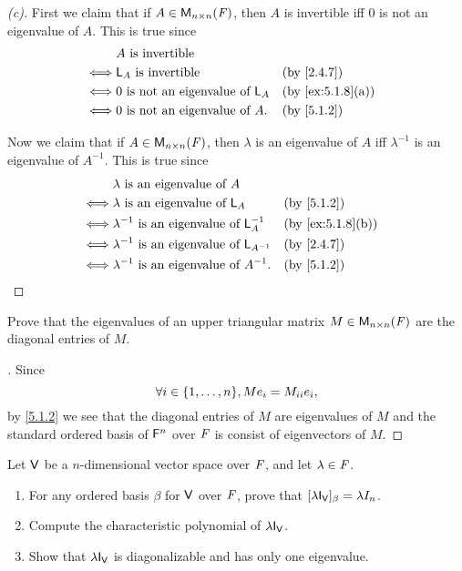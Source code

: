 \begin{proof}[(c)]
  First we claim that if \(A \in \ms[n][n][\F]\), then \(A\) is invertible iff \(0\) is not an eigenvalue of \(A\).
  This is true since
  \begin{align*}
         & A \text{ is invertible}                                       \\
    \iff & \L_A \text{ is invertible}              &  & \by{2.4.7}       \\
    \iff & 0 \text{ is not an eigenvalue of } \L_A &  & \by{ex:5.1.8}[a] \\
    \iff & 0 \text{ is not an eigenvalue of } A.   &  & \by{5.1.2}
  \end{align*}

  Now we claim that if \(A \in \ms[n][n][\F]\), then \(\lambda\) is an eigenvalue of \(A\) iff \(\lambda^{-1}\) is an eigenvalue of \(A^{-1}\).
  This is true since
  \begin{align*}
         & \lambda \text{ is an eigenvalue of } A                                      \\
    \iff & \lambda \text{ is an eigenvalue of } \L_A             &  & \by{5.1.2}       \\
    \iff & \lambda^{-1} \text{ is an eigenvalue of } \L_A^{-1}   &  & \by{ex:5.1.8}[b] \\
    \iff & \lambda^{-1} \text{ is an eigenvalue of } \L_{A^{-1}} &  & \by{2.4.7}       \\
    \iff & \lambda^{-1} \text{ is an eigenvalue of } A^{-1}.     &  & \by{5.1.2}
  \end{align*}
\end{proof}

\begin{ex}\label{ex:5.1.9}
  Prove that the eigenvalues of an upper triangular matrix \(M \in \ms[n][n][\F]\) are the diagonal entries of \(M\).
\end{ex}

\begin{proof}[]
  Since
  \[
    \forall i \in \set{1, \dots, n}, M e_i = M_{i i} e_i,
  \]
  by \cref{5.1.2} we see that the diagonal entries of \(M\) are eigenvalues of \(M\) and the standard ordered basis of \(\mathsf{F}^n\) over \(\mathit{F}\) is consist of eigenvectors of \(M\).
\end{proof}

\begin{ex}\label{ex:5.1.10}
  Let \(\mathsf{V}\) be a \(n\)-dimensional vector space over \(\mathit{F}\), and let \(\lambda \in \mathit{F}\).
  \begin{enumerate}
    \item For any ordered basis \(\beta\) for \(\mathsf{V}\) over \(\mathit{F}\), prove that \([\lambda \IT[\V]]_{\beta} = \lambda I_n\).
    \item Compute the characteristic polynomial of \(\lambda \IT[\V]\).
    \item Show that \(\lambda \IT[\V]\) is diagonalizable and has only one eigenvalue.
  \end{enumerate}
\end{ex}

